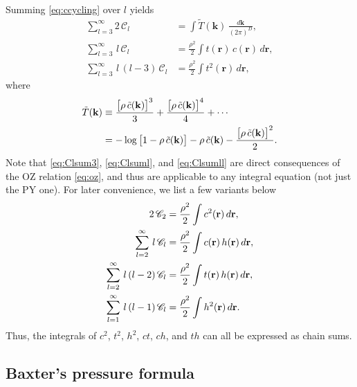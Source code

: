 \documentclass[aip,jcp,reprint,superscriptaddress]{revtex4-1}
\newcommand{\vct}[1]{\mathbf{#1}}
\providecommand{\vr}{} %
\renewcommand{\vr}{\vct{r}}
\newcommand{\vk}{\vct{k}}
\newcommand{\dvk}{\frac{d\vk}{(2\pi)^D}}
\newcommand{\Chn}{\mathscr{C}}
\begin{document}
Summing \eqref{eq:ccycling} over $l$ yields
%
\begin{align}
      \sum_{l=3}^{\infty} 2 \, \Chn_l
  &=  \int \tilde{T}(\vk) \, \dvk,
     \label{eq:Clsum3} \\
      \sum_{l=3}^{\infty} \, l \, \Chn_l
  &=
      \frac{ \rho^2 }{2} \int t(\vr) \, c(\vr) \, d\vr,
      \label{eq:Clsuml} \\
      \sum_{l=3}^{\infty} \, l \, (l - 3) \, \Chn_l
  &=  \frac{ \rho^2 }{ 2 }
      \int t^2(\vr) \, d\vr,
\label{eq:Clsumll}
\end{align}
%
where
\begin{align}
  \tilde{T}(\vk)
&\equiv
    \frac{ \big[ \rho \, \tilde{c}(\vk) \big]^3 } { 3 }
  + \frac{ \big[ \rho \, \tilde{c}(\vk) \big]^4 } { 4 }
  + \cdots
\notag \\
&=
  - \log\big[1 - \rho \, \tilde{c}(\vk) \big]
  - \rho \, \tilde{c}(\vk)
  - \frac{ \big[ \rho \, \tilde{c}(\vk) \big]^2 } { 2 }.
  \label{eq:logrhoc}
\end{align}
%
Note that \eqref{eq:Clsum3}, \eqref{eq:Clsuml}, and \eqref{eq:Clsumll}
  are direct consequences of the OZ relation \eqref{eq:oz},
  and thus are applicable to any integral equation (not just the PY one).
%
For later convenience, we list a few variants below
%
\begin{align}
      2 \, \Chn_2
  &=
      \frac{ \rho^2 }{2} \int c^2(\vr) \, d\vr,
\notag \\
%
      \sum_{l=2}^{\infty} \, l \, \Chn_l
  &=
      \frac{ \rho^2 }{2} \int c(\vr) \, h(\vr) \, d\vr,
\notag \\
%
      \sum_{l=2}^{\infty} \, l \, (l - 2) \, \Chn_l
  &=  \frac{ \rho^2 }{ 2 }
      \int t(\vr) \, h(\vr) \, d\vr,
\label{eq:Clsum_th} \\
%
      \sum_{l=1}^{\infty} \, l \, (l - 1) \, \Chn_l
  &=  \frac{ \rho^2 }{ 2 }
      \int h^2(\vr) \, d\vr.
\notag
\end{align}
%
Thus, the integrals of $c^2$, $t^2$, $h^2$, $ct$, $ch$, and $th$
can all be expressed as chain sums.



\subsection{Baxter's pressure formula}
\end{document}
